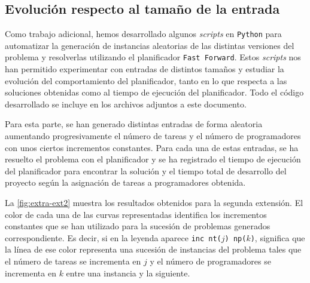 
\subsection{Evolución respecto al tamaño de la entrada} \label{sec:res-extra}

Como trabajo adicional, hemos desarrollado algunos \textit{scripts} en 
\texttt{Python} para automatizar la generación de instancias aleatorias de 
las distintas versiones del problema y resolverlas utilizando el planificador 
\texttt{Fast Forward}. Estos \textit{scripts} nos han permitido experimentar 
con entradas de distintos tamaños y estudiar la evolución del comportamiento 
del planificador, tanto en lo que respecta a las soluciones obtenidas como 
al tiempo de ejecución del planificador. Todo el código desarrollado se 
incluye en los archivos adjuntos a este documento.

Para esta parte, se han generado distintas entradas de forma aleatoria 
aumentando progresivamente el número de tareas y el número de programadores 
con unos ciertos incrementos constantes. Para cada una de estas entradas, se 
ha resuelto el problema con el planificador y se ha registrado el tiempo de 
ejecución del planificador para encontrar la solución y el tiempo total de 
desarrollo del proyecto según la asignación de tareas a programadores 
obtenida. 

La \autoref{fig:extra-ext2} muestra los resultados obtenidos para la segunda 
extensión. El color de cada una de las curvas representadas identifica los 
incrementos constantes que se han utilizado para la sucesión de problemas 
generados correspondiente. Es decir, si en la leyenda aparece 
\texttt{inc nt($j$) np($k$)}, significa que la línea de ese color representa 
una sucesión de instancias del problema tales que el número de tareas se 
incrementa en $j$ y el número de programadores se incrementa en $k$ entre 
una instancia y la siguiente.

